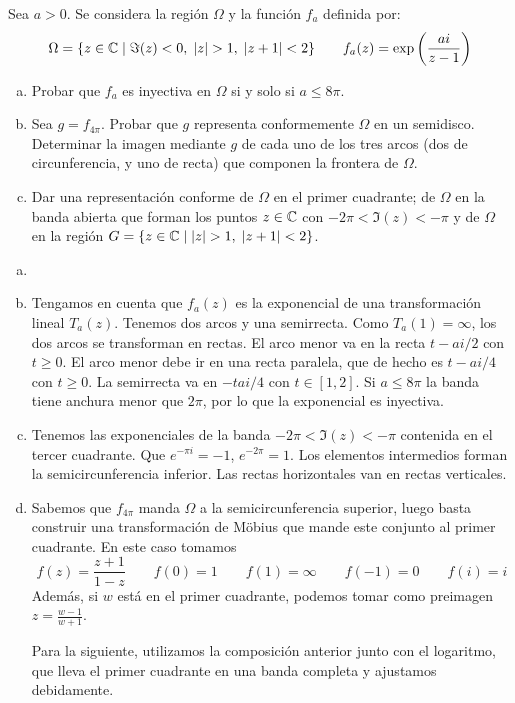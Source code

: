 \documentclass[twoside]{article}
\begin{document}
\begin{ejercicio}{12}
Sea $a>0$. Se considera la región $\Omega$ y la función $f_a$ definida por:
$$
\Omega=\{z\in \C \mid \Im(z)<0,\;|z|>1,\;|z+1|<2\} \qquad f_a(z)=\exp\left(\frac{ai}{z-1}\right)
$$
\begin{enumerate}[(a)]
\item Probar que $f_a$ es inyectiva en $\Omega$ si y solo si $a\leq 8\pi$.
\item Sea $g =f_{4\pi}$. Probar que $g$ representa conformemente $\Omega$ en un semidisco. Determinar la imagen mediante $g$ de cada uno de los tres arcos (dos de circunferencia, y uno de recta) que componen la frontera de $\Omega$.
\item Dar una representación conforme de $\Omega$ en el primer cuadrante; de $\Omega$ en la banda abierta que forman los puntos  $z\in \mathbb{C}$ con $-2\pi<\Im(z) <-\pi$ y de $\Omega$ en la región $G=\{z\in\C\mid |z|>1,\;|z+1|<2\}$.
\end{enumerate}
\end{ejercicio}
\begin{solucion}
\begin{enumerate}[(a)]
\item []
\item
Tengamos en cuenta que $f_a(z)$ es la exponencial de una transformación lineal $T_a(z)$. Tenemos dos arcos y una semirrecta. Como $T_a(1)=\infty$, los dos arcos se transforman en rectas. El arco menor va en la recta $t-ai/2$ con $t\geq 0$. El arco menor debe ir en una recta paralela, que de hecho es $t-ai/4$ con $t\geq 0$. La semirrecta va en $-tai/4$ con $t\in[1,2]$. Si $a\leq8\pi$ la banda tiene anchura menor que $2\pi$, por lo que la exponencial es inyectiva.
\item Tenemos las exponenciales de la banda $-2\pi < \Im(z)< -\pi$ contenida en el tercer cuadrante. Que $e^{-\pi i} = -1$, $e^{-2\pi} = 1$. Los elementos intermedios forman la semicircunferencia inferior. Las rectas horizontales van en rectas verticales.
\item Sabemos que $f_{4\pi}$ manda $\Omega$ a la semicircunferencia superior, luego basta construir una transformación de Möbius que mande este conjunto al primer cuadrante. En este caso tomamos
$$
f(z)=\frac{z+1}{1-z} \qquad f(0)=1 \qquad f(1)=\infty \qquad f(-1) = 0 \qquad f(i) = i
$$
Además, si $w$ está  en el primer cuadrante, podemos tomar como preimagen $z = \frac{w -1}{w +1}$.  

Para la siguiente, utilizamos la composición anterior junto con el logaritmo, que lleva el primer cuadrante en una banda completa y ajustamos debidamente.


\end{enumerate}
\end{solucion}
\newpage
\end{document}
